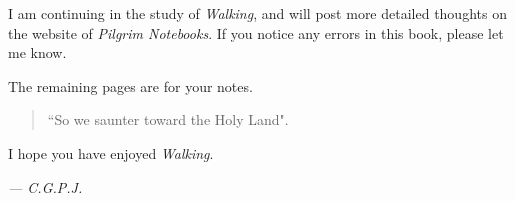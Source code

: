 \documentclass[twoside,openright,10pt]{memoir} %
\begin{document}
I am continuing in the study of \emph{Walking}, and will post more detailed thoughts on the website of \emph{Pilgrim Notebooks}. If you notice any errors in this book, please let me know.

The remaining pages are for your notes.

\begin{verse}
“So we saunter toward the Holy Land".
\end{verse}

I hope you have enjoyed \emph{Walking}.

\begin{flushright}
  \emph{— C.\thinspace G.\thinspace P.\thinspace J.\thinspace }
\end{flushright}

\newpage
\mbox{}
\newpage
\mbox{}
\newpage
\mbox{}
\newpage
\mbox{}
\newpage
\mbox{}
\newpage
\mbox{}
\newpage
\mbox{}
\newpage
\mbox{}
\newpage
\mbox{}
\newpage
\mbox{}
\newpage
\mbox{}
\newpage
\mbox{}
\newpage
\mbox{}
\newpage
\mbox{}
\end{document}
